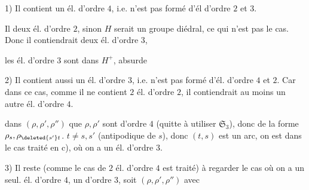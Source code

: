 
1) Il contient un él. d'ordre $4$, i.e. n'est pas formé d'él d'ordre $2$ et $3$.

Il    deux él. d'ordre $2$, sinon $H$ serait un groupe diédral, ce qui n'est pas le cas. Donc il contiendrait deux él. d'ordre $3$,  


 les él. d'ordre $3$ sont dans $H^{+}$, absurde

2) Il contient aussi un él. d'ordre $3$, i.e. n'est pas formé  d'él. d'ordre $4$ et $2$. Car dans ce cas, comme il ne contient $2$ él. d'ordre $2$, il contiendrait au moins un autre él. d'ordre $4$.

  dans $(\rho,\rho',\rho'')$ que $\rho,\rho'$ sont d'ordre $4$ (quitte à utiliser $\mathfrak S_3$), donc de la forme $\rho_s,\rho_{\deleted{s'}t}$.    $t\ne s,s'$ (antipodique de $s$), donc $(t,s)$ est un arc, on est dans le cas traité en c), où on a un él. d'ordre $3$.

3) Il reste (comme le cas de $2$ él. d'ordre $4$ est traité) à regarder le cas où on a un seul. él. d'ordre $4$, un d'ordre $3$, soit $(\rho,\rho',\rho'')$ avec

